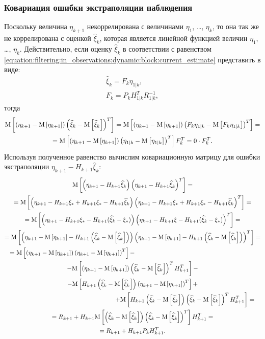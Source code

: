 \subsubsection{Ковариация ошибки экстраполяции наблюдения}

Поскольку величина $\eta_{k+1}$ некоррелирована с величинами $\eta_1$, \dots, $\eta_k$, то она так же не коррелирована с оценкой $\widehat{\xi}_k$, которая является
линейной функцией величин $\eta_1$, \dots, $\eta_k$. Действительно, если оценку $\widehat{\xi}_k$ в соответствии с равенством
\eqref{equation:filtering:in_observations:dynamic:block:current_estimate} представить в виде:
\begin{gather*}
	\widehat{\xi}_k = F_k \eta_{1|k} , \\
	F_k = P_k H_{1|k}^T R_{1|k}^{-1} ,
\end{gather*}
тогда
\begin{multline*}
	\mathrm{M} \left [ \left ( \eta_{k+1} - \mathrm{M} \left [ \eta_{k+1} \right ] \right ) \left ( \widehat{\xi}_k - \mathrm{M} \left [ \widehat{\xi}_k \right ] \right )^T \right ]
	= \mathrm{M} \left [ \left ( \eta_{k+1} - \mathrm{M} \left [ \eta_{k+1} \right ] \right ) \left ( F_k \eta_{1|k} - \mathrm{M} \left [ F_k \eta_{1|k} \right ] \right )^T \right ] = \\
	= \mathrm{M} \left [ \left ( \eta_{k+1} - \mathrm{M} \left [ \eta_{k+1} \right ] \right ) \left ( \eta_{1|k} - \mathrm{M} \left [ \eta_{1|k} \right ] \right )^T \right ] F_k^T = 0 \cdot F_k^T.
\end{multline*}
Используя полученное равенство вычислим ковариационную матрицу для ошибки экстраполяции $\eta_{k+1} - H_{k+1} \widehat{\xi}_k$:
\begin{multline*}
	\expectation{\left ( \eta_{k+1} - H_{k+1} \widehat{\xi}_k \right ) \left ( \eta_{k+1} - H_{k+1} \widehat{\xi}_k \right )^T} = \\
	= \expectation{\left ( \eta_{k+1} - H_{k+1} \xi_* + H_{k+1} \xi_* - H_{k+1} \widehat{\xi}_k \right ) \left ( \eta_{k+1} - H_{k+1} \xi_* + H_{k+1} \xi_* - H_{k+1} \widehat{\xi}_k \right )^T} = \\
	= \expectation{\left ( \eta_{k+1} - H_{k+1} \xi_* - H_{k+1} ( \widehat{\xi}_k - \xi_* ) \right ) \left ( \eta_{k+1} - H_{k+1} \xi - H_{k+1} ( \widehat{\xi}_k - \xi_* ) \right )^T} = \\
	= \expectation{\left ( \eta_{k+1} - \expectation{\eta_{k+1}} - H_{k+1} \left ( \widehat{\xi}_k - \expectation{\widehat{\xi}_k} \right ) \right ) \left ( \eta_{k+1} - \expectation{\eta_{k+1}} - H_{k+1} \left ( \widehat{\xi}_k - \expectation{\widehat{\xi}_k} \right ) \right )^T} = \\
	\shoveleft{
		= \expectation{\left ( \eta_{k+1} - \expectation{\eta_{k+1}} \right ) \left ( \eta_{k+1} - \expectation{\eta_{k+1}} \right )^T} -
	} \\
	- \expectation{\left ( \eta_{k+1} - \expectation{\eta_{k+1}} \right ) \left ( \widehat{\xi}_k - \expectation{\widehat{\xi}_k} \right )^T H_{k+1}^T} - \\
	- \expectation{H_{k+1} \left ( \widehat{\xi}_k - \expectation{\widehat{\xi}_k} \right ) \left ( \eta_{k+1} - \expectation{\eta_{k+1}} \right )^T} + \\
	\shoveright{
		+ \expectation{H_{k+1} \left ( \widehat{\xi}_k - \expectation{\widehat{\xi}_k} \right ) \left ( \widehat{\xi}_k - \expectation{\widehat{\xi}_k} \right )^T H_{k+1}^T}
		=
	} \\
	= R_{k+1} + H_{k+1} \outerexpectation{\widehat{\xi}_k}{\widehat{\xi}_k} H_{k+1}^T = \\
	= R_{k+1} + H_{k+1} P_k H_{k+1}^T .
\end{multline*}

